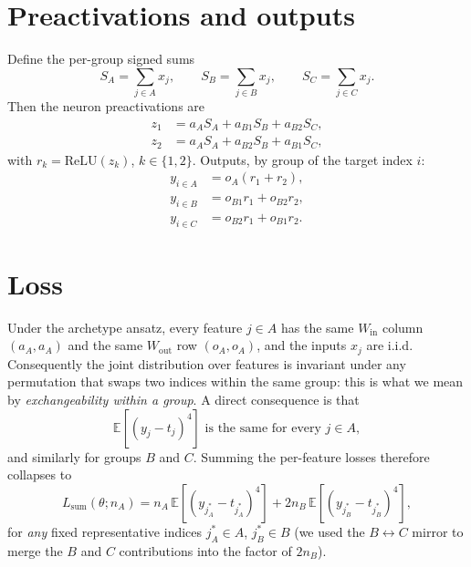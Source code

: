 \documentclass[11pt]{article}
\begin{document}
\section{Preactivations and outputs}

Define the per-group signed sums
\begin{equation*}
S_A = \sum_{j \in A} x_j, \qquad S_B = \sum_{j \in B} x_j, \qquad S_C = \sum_{j \in C} x_j.
\end{equation*}
Then the neuron preactivations are
\begin{align*}
z_1 &= a_A S_A + a_{B1} S_B + a_{B2} S_C, \\
z_2 &= a_A S_A + a_{B2} S_B + a_{B1} S_C,
\end{align*}
with $r_k = \mathrm{ReLU}(z_k)$, $k \in \{1, 2\}$. Outputs, by group of the target index $i$:
\begin{align*}
y_{i \in A} &= o_A (r_1 + r_2), \\
y_{i \in B} &= o_{B1} r_1 + o_{B2} r_2, \\
y_{i \in C} &= o_{B2} r_1 + o_{B1} r_2.
\end{align*}

\section{Loss}

Under the archetype ansatz, every feature $j \in A$ has the same $W_{\mathrm{in}}$ column $(a_A, a_A)$ and the same $W_{\mathrm{out}}$ row $(o_A, o_A)$, and the inputs $x_j$ are i.i.d. Consequently the joint distribution over features is invariant under any permutation that swaps two indices within the same group: this is what we mean by \emph{exchangeability within a group}. A direct consequence is that
\begin{equation*}
\mathbb{E}\!\left[(y_j - t_j)^4\right] \text{ is the same for every } j \in A,
\end{equation*}
and similarly for groups $B$ and $C$. Summing the per-feature losses therefore collapses to
\begin{equation}
L_{\mathrm{sum}}(\theta; n_A) = n_A \, \mathbb{E}\!\left[(y_{j_A^*} - t_{j_A^*})^4\right]
+ 2 n_B \, \mathbb{E}\!\left[(y_{j_B^*} - t_{j_B^*})^4\right],
\label{eq:loss}
\end{equation}
for \emph{any} fixed representative indices $j_A^* \in A$, $j_B^* \in B$ (we used the $B \leftrightarrow C$ mirror to merge the $B$ and $C$ contributions into the factor of $2 n_B$).
\end{document}
